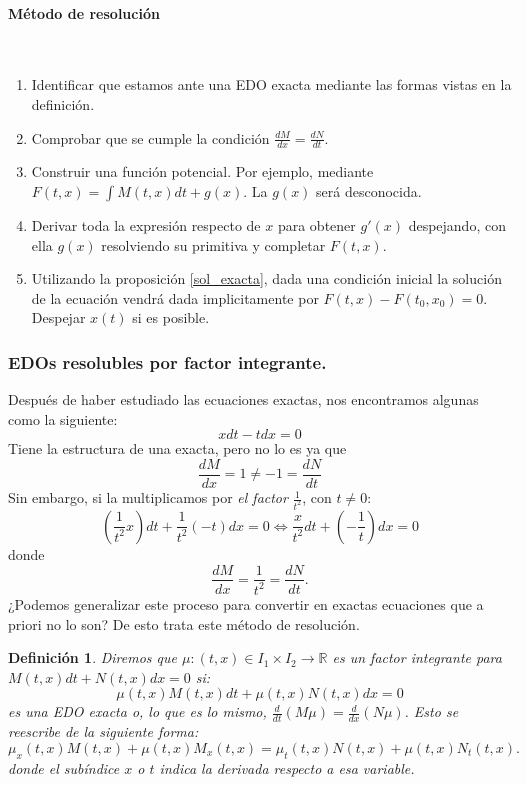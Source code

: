 \documentclass[11pt]{article}
\newcommand{\iindex}[1]{\emph{#1}\index{#1}}
\theoremstyle{theorem-style}  %
\theoremstyle{definition-style}
\newtheorem{definition}{Definición}[section]
\theoremstyle{example-style}
\begin{document}
\paragraph{Método de resolución} \ 
\begin{enumerate}
	\item Identificar que estamos ante una EDO exacta mediante las formas vistas en la definición.
	\item Comprobar que se cumple la condición $\frac{dM}{dx} = \frac{dN}{dt}$.
	\item Construir una función potencial. Por ejemplo, mediante $ F(t,x)=\int M(t, x)dt + g(x) $. La $ g(x) $ será desconocida.
	\item Derivar toda la expresión respecto de $ x $ para obtener $ g'(x) $ despejando, con ella $ g(x) $ resolviendo su primitiva y completar $ F(t,x) $.
	\item Utilizando la proposición \ref{sol_exacta}, dada una condición inicial la solución de la ecuación vendrá dada implicitamente por $F(t, x) - F(t_0, x_0) = 0$. Despejar $ x(t) $ si es posible. 
\end{enumerate}
\subsubsection{EDOs resolubles por factor integrante.}
Después de haber estudiado las ecuaciones exactas, nos encontramos algunas como la siguiente:
\[ xdt - tdx = 0 \] 
Tiene la estructura de una exacta, pero no lo es ya que 
\[ \frac{dM}{dx}=1\neq-1=\frac{dN}{dt} \]
Sin embargo, si la multiplicamos por \textit{el factor} $\frac{1}{t^2}$, con $t \neq 0$:
\[(\frac{1}{t^2}x)dt + \frac{1}{t^2}(-t)dx = 0 \Leftrightarrow \frac{x}{t^2}dt + (-\frac{1}{t})dx = 0\]
donde
\[\frac{dM}{dx} = \frac{1}{t^2} = \frac{dN}{dt}.\]
¿Podemos generalizar este proceso para convertir en exactas ecuaciones que a priori no lo son? De esto trata este método de resolución.
\begin{definition}
	Diremos que $\mu : (t, x) \in I_1 \times I_2 \longrightarrow \mathbb{R}$ es un \iindex{factor integrante} para $M(t, x)dt + N(t, x)dx = 0$ si:
	\[\mu(t, x)M(t, x)dt + \mu(t, x)N(t, x)dx = 0\]
	es una EDO exacta o, lo que es lo mismo, $\frac{d}{dt}(M\mu) = \frac{d}{dx}(N\mu)$. Esto se reescribe de la siguiente forma:
	\begin{equation} \label{eqInte}
	\mu_x(t, x)M(t, x) + \mu(t, x)M_x(t, x) = \mu_t(t, x)N(t, x) + \mu(t, x)N_t(t, x).
	\end{equation}
	donde el subíndice $ x $ o $ t $ indica la derivada respecto a esa variable.
\end{definition}
\end{document}
